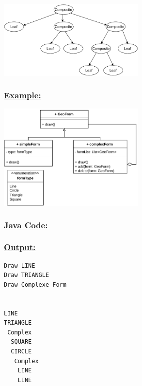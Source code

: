 \vspace{0.25cm}
\begin{center}
\includegraphics[width=0.55\textwidth,height=0.4\textheight]{Chapters/DesignPattern/Composite/tree.drawio.pdf}
\end{center}



\vspace{0.25cm}
\subsubsection*{\underline{Example:}}
\begin{center}
\includegraphics[width=0.55\textwidth,height=0.4\textheight]{Chapters/DesignPattern/Composite/comp2.drawio.pdf}
\end{center}

\newpage
\subsubsection*{\underline{Java Code:}}



\newpage

\newpage


\subsubsection*{\underline{Output:}}
\begin{lstlisting}[style=cmd]
Draw LINE
Draw TRIANGLE
Draw Complexe Form


LINE
TRIANGLE
 Complex
  SQUARE
  CIRCLE
   Complex
    LINE
    LINE
\end{lstlisting}

